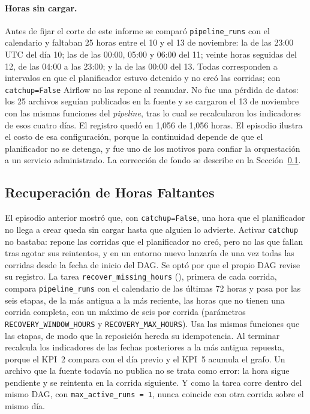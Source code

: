 \paragraph{Horas sin cargar.} Antes de fijar el corte de este informe se comparó \texttt{pipeline\_runs} con el calendario y faltaban 25 horas entre el 10 y el 13 de noviembre: la de las 23:00 UTC del día 10; las de las 00:00, 05:00 y 06:00 del 11; veinte horas seguidas del 12, de las 04:00 a las 23:00; y la de las 00:00 del 13. Todas corresponden a intervalos en que el planificador estuvo detenido y no creó las corridas; con \texttt{catchup=False} Airflow no las repone al reanudar. No fue una pérdida de datos: los 25 archivos seguían publicados en la fuente y se cargaron el 13 de noviembre con las mismas funciones del \textit{pipeline}, tras lo cual se recalcularon los indicadores de esos cuatro días. El registro quedó en 1,056 de 1,056 horas. El episodio ilustra el costo de esa configuración, porque la continuidad depende de que el planificador no se detenga, y fue uno de los motivos para confiar la orquestación a un servicio administrado. La corrección de fondo se describe en la Sección~\ref{subsec:recuperacion}.

\subsection{Recuperación de Horas Faltantes}
\label{subsec:recuperacion}

El episodio anterior mostró que, con \texttt{catchup=False}, una hora que el planificador no llega a crear queda sin cargar hasta que alguien lo advierte. Activar \texttt{catchup} no bastaba: repone las corridas que el planificador no creó, pero no las que fallan tras agotar sus reintentos, y en un entorno nuevo lanzaría de una vez todas las corridas desde la fecha de inicio del DAG. Se optó por que el propio DAG revise su registro. La tarea \texttt{recover\_missing\_hours} (), primera de cada corrida, compara \texttt{pipeline\_runs} con el calendario de las últimas 72 horas y pasa por las seis etapas, de la más antigua a la más reciente, las horas que no tienen una corrida completa, con un máximo de seis por corrida (parámetros \texttt{RECOVERY\_\bk{}WINDOW\_\bk{}HOURS} y \texttt{RECOVERY\_\bk{}MAX\_\bk{}HOURS}). Usa las mismas funciones que las etapas, de modo que la reposición hereda su idempotencia. Al terminar recalcula los indicadores de las fechas posteriores a la más antigua repuesta, porque el KPI~2 compara con el día previo y el KPI~5 acumula el grafo. Un archivo que la fuente todavía no publica no se trata como error: la hora sigue pendiente y se reintenta en la corrida siguiente. Y como la tarea corre dentro del mismo DAG, con \texttt{max\_active\_runs = 1}, nunca coincide con otra corrida sobre el mismo día.

